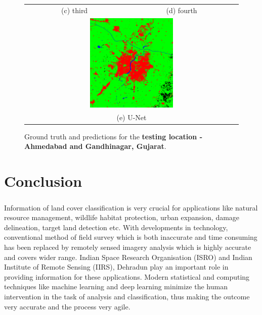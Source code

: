 \documentclass[12pt, a4paper]{report}
\begin{document}
\begin{figure}
\begin{center}
\begin{tabular}{cc}
(c) third & (d) fourth \\[6pt]
\multicolumn{2}{c}{\includegraphics[width=0.4\textwidth]{test_cnn} }\\
\multicolumn{2}{c}{(e) U-Net}
\end{tabular}
\caption{Ground truth and predictions for the \textbf{testing location - Ahmedabad and Gandhinagar, Gujarat}.}
\end{center}
\end{figure}

\chapter{Conclusion}

\paragraph{}
Information of land cover classification is very crucial for applications like natural resource management, wildlife habitat protection, urban expansion, damage delineation, target land detection etc. With developments in technology, conventional method of field survey which is both inaccurate and time consuming has been replaced by remotely sensed imagery analysis which is highly accurate and covers wider range. Indian Space Research Organisation (ISRO) and Indian Institute of Remote Sensing (IIRS), Dehradun play an important role in providing information for these applications. Modern statistical and computing techniques like machine learning and deep learning minimize the human intervention in the task of analysis and classification, thus making the outcome very accurate and the process very agile.
\end{document}
